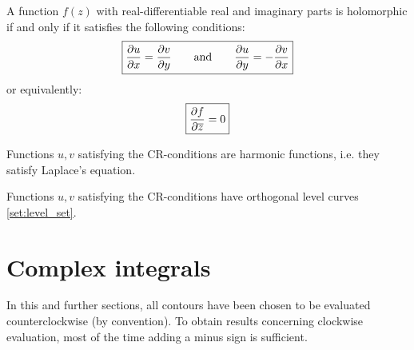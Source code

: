         \begin{theorem}
	        A function $f(z)$ with real-differentiable real and imaginary parts is holomorphic if and only if it satisfies the following conditions:
	        \begin{equation}
	                \label{complexcalculus:cauchy_riemann}
	                \boxed{\frac{\partial u}{\partial x} = \frac{\partial v}{\partial y} \text{\qquad and\qquad} \frac{\partial u}{\partial y} = -\frac{\partial v}{\partial x}}
	        \end{equation}
	        or equivalently:
	        \begin{equation}
	                \label{complexcalculus:holomorphic_alternative_condition}
	                \boxed{\frac{\partial f}{\partial \overline{z}} = 0}
	        \end{equation}
        \end{theorem}

	\begin{property}
		Functions $u,v$ satisfying the CR-conditions are harmonic functions, i.e. they satisfy Laplace's equation.
	\end{property}
	\begin{property}
		Functions $u,v$ satisfying the CR-conditions have orthogonal level curves \ref{set:level_set}.
	\end{property}

\section{Complex integrals}
		
	In this and further sections, all contours have been chosen to be evaluated counterclockwise (by convention). To obtain results concerning clockwise evaluation, most of the time adding a minus sign is sufficient.
        
        
